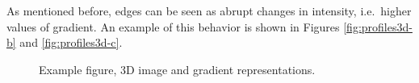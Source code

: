 \documentclass{ipol}
\numberwithin{equation}{section}
\numberwithin{table}{section}
\numberwithin{figure}{section}
\begin{document}
As mentioned before, edges can be seen as abrupt changes in intensity, i.e.\ higher values of gradient.
An example of this behavior is shown in Figures \ref{fig:profiles3d-b} and \ref{fig:profiles3d-c}. \\

\begin{figure}[t!]
	\centering

	\caption{Example figure, 3D image and gradient representations.}
	\label{fig:profiles3d}
\end{figure}
\end{document}
